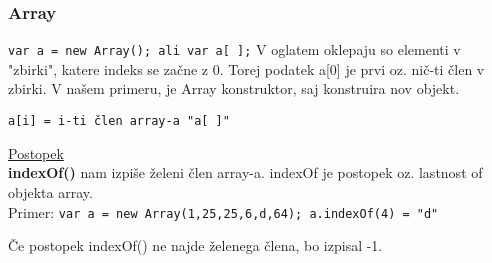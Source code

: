 \subsubsection*{Array}

\texttt{var a = new Array(); ali var a[ ];}
V oglatem oklepaju so elementi v "zbirki", katere indeks se začne z 0. Torej podatek a[0] je prvi oz. nič-ti člen v zbirki.
V našem primeru, je Array konstruktor, saj konstruira nov objekt.

\texttt{a[i] = i-ti člen array-a "a[ ]"}

\underline{Postopek}\\
\textbf{indexOf()} nam izpiše želeni člen array-a. indexOf je postopek oz. lastnost of objekta array.\\
Primer:
\texttt{var a = new Array(1,25,25,6,d,64); a.indexOf(4) = "d"}

Če postopek indexOf() ne najde želenega člena, bo izpisal -1.